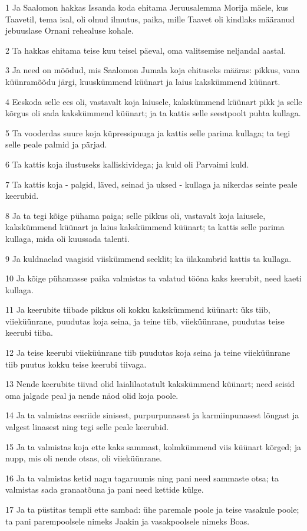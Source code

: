\par 1 Ja Saalomon hakkas Issanda koda ehitama Jeruusalemma Morija mäele, kus Taavetil, tema isal, oli olnud ilmutus, paika, mille Taavet oli kindlaks määranud jebuuslase Ornani rehealuse kohale.
\par 2 Ta hakkas ehitama teise kuu teisel päeval, oma valitsemise neljandal aastal.
\par 3 Ja need on mõõdud, mis Saalomon Jumala koja ehituseks määras: pikkus, vana küünramõõdu järgi, kuuskümmend küünart ja laius kakskümmend küünart.
\par 4 Eeskoda selle ees oli, vastavalt koja laiusele, kakskümmend küünart pikk ja selle kõrgus oli sada kakskümmend küünart; ja ta kattis selle seestpoolt puhta kullaga.
\par 5 Ta vooderdas suure koja küpressipuuga ja kattis selle parima kullaga; ta tegi selle peale palmid ja pärjad.
\par 6 Ta kattis koja ilustuseks kalliskividega; ja kuld oli Parvaimi kuld.
\par 7 Ta kattis koja - palgid, läved, seinad ja uksed - kullaga ja nikerdas seinte peale keerubid.
\par 8 Ja ta tegi kõige pühama paiga; selle pikkus oli, vastavalt koja laiusele, kakskümmend küünart ja laius kakskümmend küünart; ta kattis selle parima kullaga, mida oli kuussada talenti.
\par 9 Ja kuldnaelad vaagisid viiskümmend seeklit; ka ülakambrid kattis ta kullaga.
\par 10 Ja kõige pühamasse paika valmistas ta valatud tööna kaks keerubit, need kaeti kullaga.
\par 11 Ja keerubite tiibade pikkus oli kokku kakskümmend küünart: üks tiib, viieküünrane, puudutas koja seina, ja teine tiib, viieküünrane, puudutas teise keerubi tiiba.
\par 12 Ja teise keerubi viieküünrane tiib puudutas koja seina ja teine viieküünrane tiib puutus kokku teise keerubi tiivaga.
\par 13 Nende keerubite tiivad olid laialilaotatult kakskümmend küünart; need seisid oma jalgade peal ja nende näod olid koja poole.
\par 14 Ja ta valmistas eesriide sinisest, purpurpunasest ja karmiinpunasest lõngast ja valgest linasest ning tegi selle peale keerubid.
\par 15 Ja ta valmistas koja ette kaks sammast, kolmkümmend viis küünart kõrged; ja nupp, mis oli nende otsas, oli viieküünrane.
\par 16 Ja ta valmistas ketid nagu tagaruumis ning pani need sammaste otsa; ta valmistas sada granaatõuna ja pani need kettide külge.
\par 17 Ja ta püstitas templi ette sambad: ühe paremale poole ja teise vasakule poole; ta pani parempoolsele nimeks Jaakin ja vasakpoolsele nimeks Boas.

